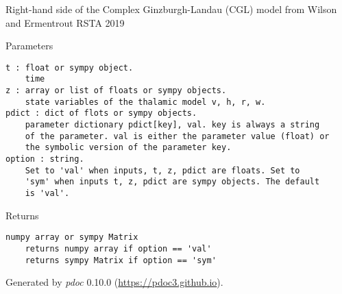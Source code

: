 \documentclass[english,a4paper,oneside]{article}
\begin{document}
Right-hand side of the Complex Ginzburgh-Landau (CGL) model from Wilson
and Ermentrout RSTA 2019

Parameters

\begin{verbatim}
t : float or sympy object.
    time
z : array or list of floats or sympy objects.
    state variables of the thalamic model v, h, r, w.
pdict : dict of flots or sympy objects.
    parameter dictionary pdict[key], val. key is always a string
    of the parameter. val is either the parameter value (float) or 
    the symbolic version of the parameter key.
option : string.
    Set to 'val' when inputs, t, z, pdict are floats. Set to
    'sym' when inputs t, z, pdict are sympy objects. The default
    is 'val'.
\end{verbatim}

Returns

\begin{verbatim}
numpy array or sympy Matrix
    returns numpy array if option == 'val'
    returns sympy Matrix if option == 'sym'
\end{verbatim}

Generated by \emph{pdoc} 0.10.0 (\url{https://pdoc3.github.io}).
\end{document}
